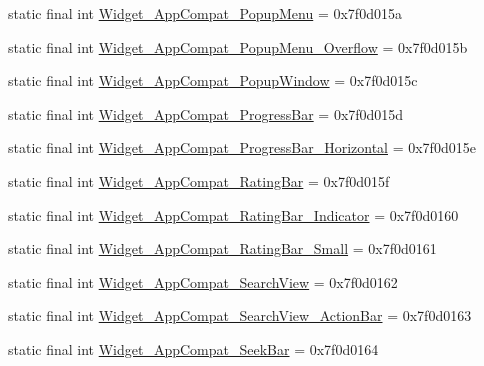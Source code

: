 \begin{DoxyCompactItemize}
\item 
static final int \mbox{\hyperlink{classcom_1_1synnapps_1_1carouselview_1_1_r_1_1style_ab77a8d650a60d0412368fc3005d5049f}{Widget\+\_\+\+App\+Compat\+\_\+\+Popup\+Menu}} = 0x7f0d015a
\item 
static final int \mbox{\hyperlink{classcom_1_1synnapps_1_1carouselview_1_1_r_1_1style_aef5e2736f0ca120ef4517265a8ae5ffa}{Widget\+\_\+\+App\+Compat\+\_\+\+Popup\+Menu\+\_\+\+Overflow}} = 0x7f0d015b
\item 
static final int \mbox{\hyperlink{classcom_1_1synnapps_1_1carouselview_1_1_r_1_1style_a55457d508e7bf1a61c80fd741b19399b}{Widget\+\_\+\+App\+Compat\+\_\+\+Popup\+Window}} = 0x7f0d015c
\item 
static final int \mbox{\hyperlink{classcom_1_1synnapps_1_1carouselview_1_1_r_1_1style_ab2bd86d75720df6763e187f1d928ce8a}{Widget\+\_\+\+App\+Compat\+\_\+\+Progress\+Bar}} = 0x7f0d015d
\item 
static final int \mbox{\hyperlink{classcom_1_1synnapps_1_1carouselview_1_1_r_1_1style_a2fb01d0848c75185ddf6276530acc19a}{Widget\+\_\+\+App\+Compat\+\_\+\+Progress\+Bar\+\_\+\+Horizontal}} = 0x7f0d015e
\item 
static final int \mbox{\hyperlink{classcom_1_1synnapps_1_1carouselview_1_1_r_1_1style_a48ebe9ae9ac63750d1cbc5901afbdfbd}{Widget\+\_\+\+App\+Compat\+\_\+\+Rating\+Bar}} = 0x7f0d015f
\item 
static final int \mbox{\hyperlink{classcom_1_1synnapps_1_1carouselview_1_1_r_1_1style_a9879de1df34b508de2037e9f886a2589}{Widget\+\_\+\+App\+Compat\+\_\+\+Rating\+Bar\+\_\+\+Indicator}} = 0x7f0d0160
\item 
static final int \mbox{\hyperlink{classcom_1_1synnapps_1_1carouselview_1_1_r_1_1style_ae6f167e6698b1563d27d23607f2855be}{Widget\+\_\+\+App\+Compat\+\_\+\+Rating\+Bar\+\_\+\+Small}} = 0x7f0d0161
\item 
static final int \mbox{\hyperlink{classcom_1_1synnapps_1_1carouselview_1_1_r_1_1style_a6a1b98e54b4d33636b4c74eaf1f3b284}{Widget\+\_\+\+App\+Compat\+\_\+\+Search\+View}} = 0x7f0d0162
\item 
static final int \mbox{\hyperlink{classcom_1_1synnapps_1_1carouselview_1_1_r_1_1style_abd76c94fca3e33048d08a505f7b96a58}{Widget\+\_\+\+App\+Compat\+\_\+\+Search\+View\+\_\+\+Action\+Bar}} = 0x7f0d0163
\item 
static final int \mbox{\hyperlink{classcom_1_1synnapps_1_1carouselview_1_1_r_1_1style_a55496b3bcefc805b38022a97272619da}{Widget\+\_\+\+App\+Compat\+\_\+\+Seek\+Bar}} = 0x7f0d0164
\item 

\end{DoxyCompactItemize}
